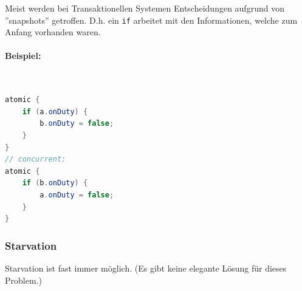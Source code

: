 Meist werden bei Transaktionellen Systemen Entscheidungen aufgrund von ''snapshots'' getroffen. D.h. ein \lstinline|if| arbeitet mit den Informationen, welche zum Anfang vorhanden waren.

\paragraph{Beispiel:} \hfill \\
\begin{lstlisting}[language=java]
atomic {
	if (a.onDuty) {
		b.onDuty = false;
	}
}
// concurrent:
atomic {
	if (b.onDuty) {
		a.onDuty = false;
	}
}
\end{lstlisting}


\subsubsection{Starvation}

Starvation ist fast immer möglich. (Es gibt keine elegante Lösung für dieses Problem.)


